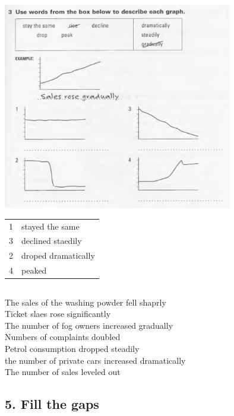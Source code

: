\documentclass[a4paper,12pt]{article}
\begin{document}
\subsubsection{}
\includegraphics[width=10cm]{ang-2019-11-14-HW-03.png} \\
\begin{tabular}{rl}
1 & stayed the same \\
3 & declined staedily \\
2 & droped dramatically \\
4 & peaked \\
\end{tabular}

\subsection{}
The sales of the washing powder fell shaprly \\
Ticket slaes rose significantly \\
The number of fog owners increased gradually \\
Numbers of complaints doubled \\
Petrol consumption dropped steadily \\
the number of private cars increased dramatically \\
The number of sales leveled out \\

\subsection{5. Fill the gaps}


\section{}
\end{document}
